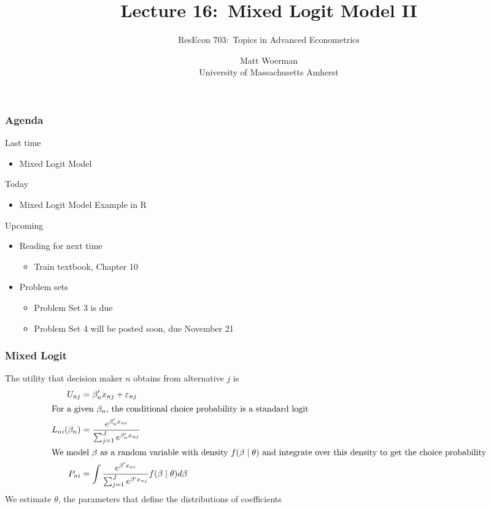 \documentclass{beamer}\usepackage[]{graphicx}\usepackage[]{color}
\title[Lecture 16:\ Mixed Logit Model II]{Lecture 16:\ Mixed Logit Model II}
\author[ResEcon 703:\ Advanced Econometrics]{ResEcon 703:\ Topics in Advanced Econometrics}
\date{Matt Woerman\\University of Massachusetts Amherst}
\begin{document}
{ 
\begin{frame}[noframenumbering]
    \titlepage
\end{frame}
}

\begin{frame}\frametitle{Agenda}
    Last time
    \begin{itemize}
        \item Mixed Logit Model
    \end{itemize}
    \vspace{2ex}
    Today
    \begin{itemize}
        \item Mixed Logit Model Example in R
    \end{itemize}
    \vspace{2ex}
    Upcoming
    \begin{itemize}
        \item Reading for next time
        \begin{itemize}
            \item Train textbook, Chapter 10
        \end{itemize}
        \item Problem sets
        \begin{itemize}
            \item Problem Set 3 is due
            \item Problem Set 4 will be posted soon, due November 21
        \end{itemize}
    \end{itemize}
\end{frame}

\begin{frame}\frametitle{Mixed Logit}
	The utility that decision maker $n$ obtains from alternative $j$ is
	\begin{align*}
		U_{nj} &= \beta_n' x_{nj} + \varepsilon_{nj} \\
	    \intertext{For a given $\beta_n$, the conditional choice probability is a standard logit}
	    L_{ni}(\beta_n) &= \frac{e^{\beta_n' x_{ni}}}{\sum_{j = 1}^J e^{\beta_n' x_{nj}}} \\
	    \intertext{We model $\beta$ as a random variable with density $f(\beta \mid \theta)$ and integrate over this density to get the choice probability}
	    P_{ni} &= \int \frac{e^{\beta' x_{ni}}}{\sum_{j = 1}^J e^{\beta' x_{nj}}} f(\beta \mid \theta) d \beta
	\end{align*}
	We estimate $\theta$, the parameters that define the distributions of coefficients
\end{frame}
\end{document}
